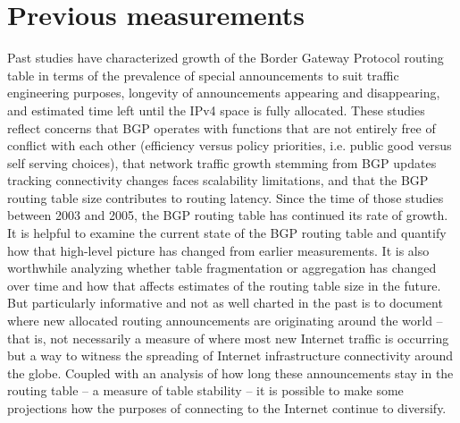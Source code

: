 
\section{Previous measurements}
\label{sec:related_work}

Past studies have characterized growth of the Border Gateway Protocol routing table in terms of the prevalence of special announcements to suit traffic engineering purposes, longevity of announcements appearing and disappearing, and estimated time left until the IPv4 space is fully allocated.  These studies reflect concerns that BGP operates with functions that are not entirely free of conflict with each other (efficiency versus policy priorities, i.e. public good versus self serving choices), that network traffic growth stemming from BGP updates tracking connectivity changes faces scalability limitations, and that the BGP routing table size contributes to routing latency.  Since the time of those studies between 2003 and 2005, the BGP routing table has continued its rate of growth.  It is helpful to examine the current state of the BGP routing table and quantify how that high-level picture has changed from earlier measurements.  It is also worthwhile analyzing whether table fragmentation or aggregation has changed over time and how that affects estimates of the routing table size in the future.  But particularly informative and not as well charted in the past is to document where new allocated routing announcements are originating around the world -- that is, not necessarily a measure of where most new Internet traffic is occurring but a way to witness the spreading of Internet infrastructure connectivity around the globe.  Coupled with an analysis of how long these announcements stay in the routing table -- a measure of table stability -- it is possible to make some projections how the purposes of connecting to the Internet continue to diversify.